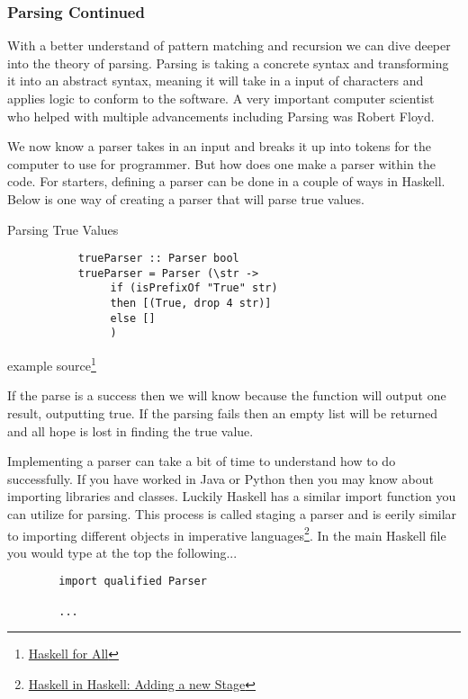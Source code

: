 \documentclass{article}
\begin{document}
        
        \subsubsection{Parsing Continued}
        With a better understand of pattern matching and recursion we can dive deeper into the theory of parsing. Parsing is taking a concrete syntax and transforming it into an abstract syntax, meaning it will take in a input of characters and applies logic to conform to the software. A very important computer scientist who helped with multiple advancements including Parsing was Robert Floyd.
        
        \medskip
        We now know a parser takes in an input and breaks it up into tokens for the computer to use for programmer. But how does one make a parser within the code. For starters, defining a parser can be done in a couple of ways in Haskell. Below is one way of creating a parser that will parse true values. 
        
        \medskip
        \caption{Parsing True Values}
        \begin{lstlisting}
           trueParser :: Parser bool
           trueParser = Parser (\str ->
                if (isPrefixOf "True" str)
                then [(True, drop 4 str)] 
                else []
                )
        \end{lstlisting}
        example source\footnote{\href{https://www.haskellforall.com/2012/10/parsing-chemical-substructures.html}{Haskell for All}}
        
        \medskip If the parse is a success then we will know because the function will output one result, outputting true. If the parsing fails then an empty list will be returned and all hope is lost in finding the true value. 
        
        \medskip Implementing a parser can take a bit of time to understand how to do successfully. If you have worked in Java or Python then you may know about importing libraries and classes. Luckily Haskell has a similar import function you can utilize for parsing. This process is called staging a parser and is eerily similar to importing different objects in imperative languages\footnote{\href{https://cronokirby.com/posts/2020/12/haskell-in-haskell-3/}{Haskell in Haskell: Adding a new Stage}}. In the main Haskell file you would type at the top the following...
        
        \begin{lstlisting}
        import qualified Parser
        
        ...
        \end{lstlisting}
        
\end{document}
